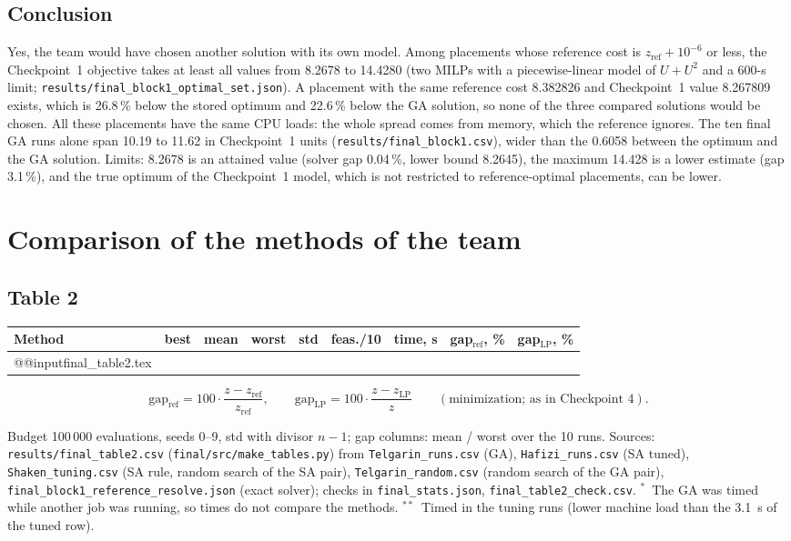 \documentclass[11pt,a4paper]{article}
\newcommand{\zref}{z_{\mathrm{ref}}}
\newcommand{\zLP}{z_{\mathrm{LP}}}
\begin{document}
\subsection*{Conclusion}
Yes, the team would have chosen another solution with its own model. Among placements whose reference cost is $\zref+10^{-6}$ or less, the Checkpoint~1 objective takes at least all values from 8.2678 to 14.4280 (two MILPs with a piecewise-linear model of $U+U^2$ and a 600-s limit; \texttt{results/final\_block1\_optimal\_set.json}). A placement with the same reference cost 8.382826 and Checkpoint~1 value 8.267809 exists, which is 26.8\,\% below the stored optimum and 22.6\,\% below the GA solution, so none of the three compared solutions would be chosen. All these placements have the same CPU loads: the whole spread comes from memory, which the reference ignores. The ten final GA runs alone span 10.19 to 11.62 in Checkpoint~1 units (\texttt{results/final\_block1.csv}), wider than the 0.6058 between the optimum and the GA solution. Limits: 8.2678 is an attained value (solver gap 0.04\,\%, lower bound 8.2645), the maximum 14.428 is a lower estimate (gap 3.1\,\%), and the true optimum of the Checkpoint~1 model, which is not restricted to reference-optimal placements, can be lower.

\section{Comparison of the methods of the team}

\subsection*{Table 2}
{\small\setlength{\tabcolsep}{4pt}
\begin{tabularx}{\textwidth}{@{}Xrrrrrrrr@{}}
\toprule
Method & best & mean & worst & std & feas./10 & time, s & gap$_{\mathrm{ref}}$, \% & gap$_{\mathrm{LP}}$, \%\\
\midrule
\csname @@input\endcsname final_table2.tex
\bottomrule
\end{tabularx}}
\[
\mathrm{gap}_{\mathrm{ref}}=100\cdot\frac{z-\zref}{\zref},\qquad
\mathrm{gap}_{\mathrm{LP}}=100\cdot\frac{z-\zLP}{z}\qquad(\text{minimization; as in Checkpoint 4}).
\]
{\small\raggedright Budget 100\,000 evaluations, seeds 0--9, std with divisor $n-1$; gap columns: mean / worst over the 10 runs. Sources: \texttt{results/final\_table2.csv} (\texttt{final/src/make\_tables.py}) from \texttt{Telgarin\_runs.csv} (GA), \texttt{Hafizi\_runs.csv} (SA tuned), \texttt{Shaken\_tuning.csv} (SA rule, random search of the SA pair), \texttt{Telgarin\_random.csv} (random search of the GA pair), \texttt{final\_block1\_reference\_resolve.json} (exact solver); checks in \texttt{final\_stats.json}, \texttt{final\_table2\_check.csv}. $^{*}$~The GA was timed while another job was running, so times do not compare the methods. $^{**}$~Timed in the tuning runs (lower machine load than the 3.1~s of the tuned row).\par}
\end{document}
